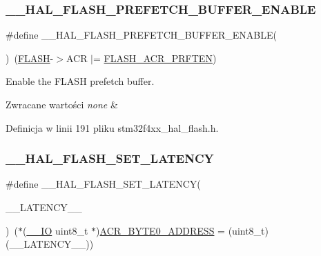 \subsubsection{\texorpdfstring{\+\_\+\+\_\+\+H\+A\+L\+\_\+\+F\+L\+A\+S\+H\+\_\+\+P\+R\+E\+F\+E\+T\+C\+H\+\_\+\+B\+U\+F\+F\+E\+R\+\_\+\+E\+N\+A\+B\+LE}{\_\_HAL\_FLASH\_PREFETCH\_BUFFER\_ENABLE}}
{\footnotesize\ttfamily \#define \+\_\+\+\_\+\+H\+A\+L\+\_\+\+F\+L\+A\+S\+H\+\_\+\+P\+R\+E\+F\+E\+T\+C\+H\+\_\+\+B\+U\+F\+F\+E\+R\+\_\+\+E\+N\+A\+B\+LE(\begin{DoxyParamCaption}{ }\end{DoxyParamCaption})~(\hyperlink{group___peripheral__declaration_ga844ea28ba1e0a5a0e497f16b61ea306b}{F\+L\+A\+SH}-\/$>$A\+CR $\vert$= \hyperlink{group___peripheral___registers___bits___definition_ga082e7e91fffee86db39676396d01a8e0}{F\+L\+A\+S\+H\+\_\+\+A\+C\+R\+\_\+\+P\+R\+F\+T\+EN})}



Enable the F\+L\+A\+SH prefetch buffer. 


\begin{DoxyRetVals}{Zwracane wartości}
{\em none} & \\
\hline
\end{DoxyRetVals}


Definicja w linii 191 pliku stm32f4xx\+\_\+hal\+\_\+flash.\+h.

\mbox{\label{group___f_l_a_s_h___exported___macros_gac1c9f459b798cc3700b90a6245df5a1a}} 
\subsubsection{\texorpdfstring{\+\_\+\+\_\+\+H\+A\+L\+\_\+\+F\+L\+A\+S\+H\+\_\+\+S\+E\+T\+\_\+\+L\+A\+T\+E\+N\+CY}{\_\_HAL\_FLASH\_SET\_LATENCY}}
{\footnotesize\ttfamily \#define \+\_\+\+\_\+\+H\+A\+L\+\_\+\+F\+L\+A\+S\+H\+\_\+\+S\+E\+T\+\_\+\+L\+A\+T\+E\+N\+CY(\begin{DoxyParamCaption}\item[{}]{\+\_\+\+\_\+\+L\+A\+T\+E\+N\+C\+Y\+\_\+\+\_\+ }\end{DoxyParamCaption})~($\ast$(\hyperlink{core__sc300_8h_aec43007d9998a0a0e01faede4133d6be}{\+\_\+\+\_\+\+IO} uint8\+\_\+t $\ast$)\hyperlink{group___f_l_a_s_h___private___constants_gaeaca61fbcff69df08100280868bff214}{A\+C\+R\+\_\+\+B\+Y\+T\+E0\+\_\+\+A\+D\+D\+R\+E\+SS} = (uint8\+\_\+t)(\+\_\+\+\_\+\+L\+A\+T\+E\+N\+C\+Y\+\_\+\+\_\+))}



